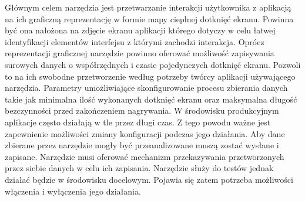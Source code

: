 \begin{enumerate}[label=\textbf{F.\arabic*}]
	 Głównym celem narzędzia jest przetwarzanie interakcji użytkownika z aplikacją na ich graficzną reprezentację w formie mapy cieplnej dotknięć ekranu. Powinna być ona nałożona na zdjęcie ekranu aplikacji którego dotyczy w celu łatwej identyfikacji elementów interfejsu z którymi zachodzi interakcja.
	 Oprócz reprezentacji graficznej narzędzie powinno oferować możliwość zapisywania surowych danych o współrzędnych i czasie pojedynczych dotknięć ekranu. Pozwoli to na ich swobodne przetworzenie według potrzeby twórcy aplikacji używającego narzędzia.
	 Parametry umożliwiające skonfigurowanie procesu zbierania danych takie jak minimalna ilość wykonanych dotknięć ekranu oraz maksymalna długość bezczynności przed zakończeniem nagrywania.
	 W środowisku produkcyjnym aplikacje często działają w tle przez długi czas. Z tego powodu ważne jest zapewnienie możliwości zmiany konfiguracji podczas jego działania.
	 Aby dane zbierane przez narzędzie mogły być przeanalizowane muszą zostać wysłane i zapisane. Narzędzie musi oferować mechanizm przekazywania przetworzonych przez siebie danych w celu ich zapisania.
	 Narzędzie służy do testów jednak działać będzie w środowisku docelowym. Pojawia się zatem potrzeba możliwości włączenia i wyłączenia jego działania.
\end{enumerate}
